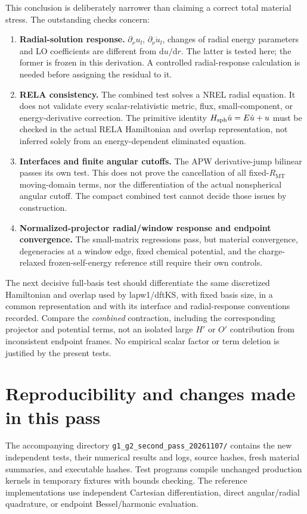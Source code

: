 \documentclass[11pt]{article}
\newcommand{\dd}{\mathrm d}
\newcommand{\MT}{\mathrm{MT}}
\begin{document}
This conclusion is deliberately narrower than claiming a correct total material stress. The outstanding checks concern:
\begin{enumerate}
\item \textbf{Radial-solution response.} $\partial_\nu u_l$, $\partial_\nu\dot u_l$, changes of radial energy parameters and LO coefficients are different from $\dd u/\dd r$. The latter is tested here; the former is frozen in this derivation. A controlled radial-response calculation is needed before assigning the residual to it.
\item \textbf{RELA consistency.} The combined test solves a NREL radial equation. It does not validate every scalar-relativistic metric, flux, small-component, or energy-derivative correction. The primitive identity $H_{\rm sph}\dot u=E\dot u+u$ must be checked in the actual RELA Hamiltonian and overlap representation, not inferred solely from an energy-dependent eliminated equation.
\item \textbf{Interfaces and finite angular cutoffs.} The APW derivative-jump bilinear passes its own test. This does not prove the cancellation of all fixed-$R_{\MT}$ moving-domain terms, nor the differentiation of the actual nonspherical angular cutoff. The compact combined test cannot decide those issues by construction.
\item \textbf{Normalized-projector radial/window response and endpoint convergence.} The small-matrix regressions pass, but material convergence, degeneracies at a window edge, fixed chemical potential, and the charge-relaxed frozen-self-energy reference still require their own controls.
\end{enumerate}
The next decisive full-basis test should differentiate the same discretized Hamiltonian and overlap used by lapw1/dftKS, with fixed basis size, in a common representation and with its interface and radial-response conventions recorded. Compare the \emph{combined} contraction, including the corresponding projector and potential terms, not an isolated large $H'$ or $O'$ contribution from inconsistent endpoint frames. No empirical scalar factor or term deletion is justified by the present tests.

\section{Reproducibility and changes made in this pass}
The accompanying directory \nolinkurl{g1_g2_second_pass_20261107/} contains the new independent tests, their numerical results and logs, source hashes, fresh material summaries, and executable hashes. Test programs compile unchanged production kernels in temporary fixtures with bounds checking. The reference implementations use independent Cartesian differentiation, direct angular/radial quadrature, or endpoint Bessel/harmonic evaluation.
\end{document}
